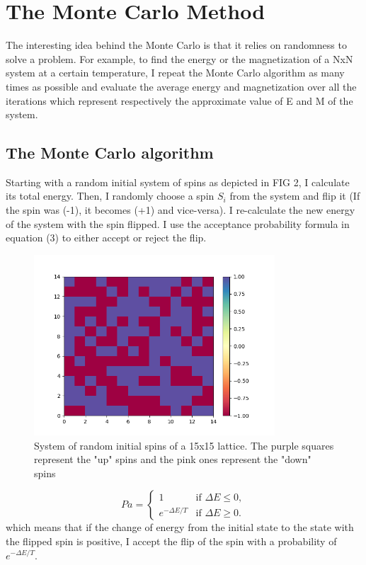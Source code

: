 \documentclass[aps,twocolumn,twoside,secnumarabic,balancelastpage,amsmath,amssymb,nofootinbib,hyperref=pdftex]{revtex4}
\begin{document}
\section{The Monte Carlo Method}
The interesting idea behind the Monte Carlo is that it relies on randomness to solve a problem. For example, to find the energy or the magnetization of a NxN system at a certain temperature, I repeat the Monte Carlo algorithm as many times as possible and evaluate the average energy and magnetization over all the iterations which represent respectively the approximate value of E and M of the system.
\subsection{The Monte Carlo algorithm}
Starting with a random initial system of spins as depicted in FIG 2, I calculate its total energy. Then, I randomly choose a spin $S_i$ from the system and flip it (If the spin was (-1), it becomes (+1) and vice-versa). I re-calculate the new energy of the system with the spin flipped. I use the acceptance probability formula in equation (3) to either accept or reject the flip.

\begin{figure}[htb]
\includegraphics[width=9cm]{initial_spins.png}	
\caption{System of random initial spins of a 15x15 lattice. The purple squares represent the "up" spins and the pink ones represent the "down" spins}
\end{figure}

\begin{equation}
Pa= \left\{ \begin{array}{ll}
              1 & \mbox{if $\Delta E \leqslant 0 $},\\
              e^{-\Delta E/T} & \mbox{if $\Delta E \geqslant 0 $}.\end{array} \right.
\end{equation}
which means that if the change of energy from the initial state to the state with the flipped spin is positive, I accept the flip of the spin with a probability of  $e^{-\Delta E/T}$. 
\end{document}
